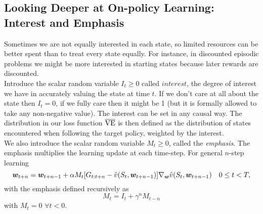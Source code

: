 \subsection{Looking Deeper at On-policy Learning: Interest and Emphasis}
Sometimes we are not equally interested in each state, so limited resources can be better spent than to treat every state equally. For instance, in discounted episodic problems we might be more interested in starting states because later rewards are discounted. \\

Introduce the scalar random variable $I_t \geq 0 $ called $interest$, the degree of interest we have in accurately valuing the state at time $t$. If we don't care at all about the state then $I_t = 0$, if we fully care then it might be 1 (but it is formally allowed to take any non-negative value). The interest can be set in any causal way. The distribution in our loss function $\overline{\mathrm{VE}}$ is then defined as the distribution of states encountered when following the target policy, weighted by the interest.\\

We also introduce the scalar random variable $M_t \geq 0$, called the \emph{emphasis}. The emphasis multiplies the learning update at each time-step. For general $n$-step learning
\begin{equation}
    \boldsymbol{w}_{t+n} = \boldsymbol{w}_{t + n - 1} + \alpha M_t [G_{t:t+n} - \hat{v}(S_t, \boldsymbol{w}_{t+n-1})] \nabla_{\boldsymbol{w}} \hat{v}(S_t, \boldsymbol{w}_{t+n-1}) \quad 0 \leq t < T,
\end{equation}
with the emphasis defined recursively as
\begin{equation}
    M_t = I_t + \gamma^n M_{t-n}
\end{equation}
with $M_t = 0$ $\forall t < 0$.



